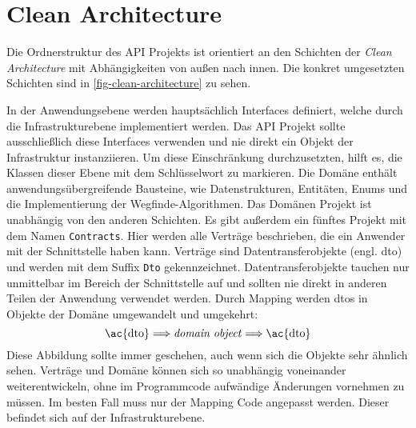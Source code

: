 \part{Clean Architecture} \label{part:clean-architecture}
Die Ordnerstruktur des API Projekts ist orientiert an den Schichten
der \textit{Clean Architecture}
mit Abhän\-gigkeiten von außen nach innen. Die konkret umgesetzten Schichten
sind in \autoref{fig-clean-architecture} zu sehen.



\noindent
In der Anwendungsebene werden hauptsächlich Interfaces definiert, welche
durch die Infrastrukturebene implementiert werden. Das API Projekt
sollte ausschließlich diese Interfaces verwenden und nie direkt
ein Objekt der Infrastruktur instanziieren.
Um diese Einschränkung durchzusetzten, hilft es,
die Klassen dieser Ebene mit dem Schlüsselwort  zu markieren.
Die Domäne enthält anwendungsübergreifende Bausteine, wie
Datenstrukturen, Entitäten, Enums und die Implementierung der Wegfinde-Algorith\-men.
Das Domänen Projekt ist unabhängig von den anderen Schichten.
Es gibt außerdem ein fünftes Projekt mit dem Namen \texttt{Contracts}. Hier
werden alle Verträge beschrieben, die ein Anwender mit der Schnittstelle
haben kann. Verträge sind Datentransferobjekte (engl. \ac{dto})
und werden mit dem Suffix \texttt{Dto} gekennzeichnet. Datentransferobjekte
tauchen nur unmittelbar im Bereich der Schnittstelle auf und
sollten nie direkt in anderen Teilen der Anwendung verwendet werden.
Durch Mapping werden \acp{dto} in Objekte der Domäne umgewandelt und umgekehrt:
\begin{equation}
  \label{eq:mapping}
  \text{\ac{dto}} \Longrightarrow \text{\textit{domain object}} \Longrightarrow \text{\ac{dto}}
\end{equation}
Diese Abbildung sollte immer geschehen, auch wenn sich die Objekte
sehr ähnlich sehen.
Verträge und Domäne können sich so unabhängig voneinander weiterentwickeln,
ohne im Programmcode aufwändige Änderungen vornehmen zu müssen.
Im besten Fall muss nur der Mapping Code angepasst werden.
Dieser befindet sich auf der Infrastrukturebene.